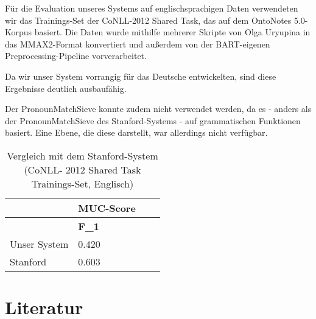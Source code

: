 \documentclass{scrartcl}
\begin{document}
Für die Evaluation unseres Systems auf englischsprachigen Daten verwendeten wir das Trainings-Set der CoNLL-2012 Shared Task, das auf dem OntoNotes 5.0-Korpus basiert. Die Daten wurde mithilfe mehrerer Skripte von Olga Uryupina in das MMAX2-Format konvertiert und außerdem von der BART-eigenen Preprocessing-Pipeline vorverarbeitet.

Da wir unser System vorrangig für das Deutsche entwickelten, sind diese Ergebnisse deutlich ausbaufähig.

Der PronounMatchSieve konnte zudem nicht verwendet werden, da es - anders als der PronounMatchSieve des Stanford-Systems - auf grammatischen Funktionen basiert. Eine Ebene, die diese darstellt, war allerdings nicht verfügbar. \\

\begin{table}[h]
\begin{tabular}{l||ll|l}
& \multicolumn{1}{c}{\textbf{MUC-Score}} \\ \hline
          &    \textbf{F\_1}    \\ \hline
Unser System &	  0.420  \\
Stanford   &	0.603
          
\end{tabular}
\caption{Vergleich mit dem Stanford-System (CoNLL- 2012 Shared Task Trainings-Set, Englisch)}
\label{tab:ml_vergleich}
\end{table}


\clearpage

\nocite{*}
\renewcommand*{\refname}{} %
\section{Literatur}  
{}

\end{document}
